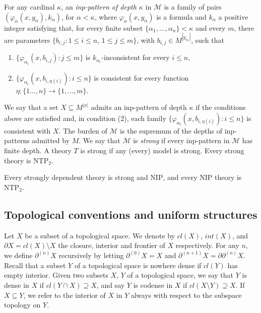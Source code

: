 \documentclass[12pt]{article}
\newcommand{\Mm}{\mathcal{M}}
\newcommand{\NIP}{\ensuremath{\mathrm{NIP}}}
\newcommand{\NTP}{\ensuremath{\mathrm{NTP}_2}}
\newcommand{\TP}{\ensuremath{\mathrm{TP}_2}}
\newcommand{\partn}[1]{\partial^{(#1)}}
\theoremstyle{definition}
\theoremstyle{remark}
\begin{document}
For any cardinal $\kappa$, an \emph{inp-pattern of depth $\kappa$} in $\Mm$ is a family of pairs $
(\varphi_\alpha(x,y_\alpha), k_\alpha)
$,
for $\alpha < \kappa$, where $\varphi_\alpha(x,y_\alpha)$ is a formula and $k_\alpha$ a positive integer satisfying that, for every finite subset $\{ \alpha_1,\ldots, \alpha_n\} < \kappa$ and every $m$, there are parameters \mbox{$\{b_{i,j} : 1\leq i\leq n, \, 1\leq j \leq m\}$}, with $b_{i,j}\in M^{|y_{\alpha_i}|}$, such that
\begin{enumerate}[(1)]
    \item $\{\varphi_{\alpha_i}(x , b_{i,j}) : j \leq m\}$ is $k_{\alpha_i}$-inconsistent for every $i\leq n$,
    \item $\{\varphi_{\alpha_i}(x, b_{i,\eta(i)}) : i\leq n\}$ is consistent for every function $\eta : \{1\ldots, n\} \rightarrow \{1,\ldots, m\}$.
\end{enumerate}
We say that a set $X\subseteq M^{|x|}$ admits an inp-pattern of depth $\kappa$ if the conditions above are satisfied and, in condition (2), each family $\{\varphi_{\alpha_i}(x, b_{i,\eta(i)}) : i\leq n\}$ is consistent with $X$. The burden of $\Mm$ is the supremum of the depths of inp-patterns admitted by $M$. %
We say that $\Mm$ is \emph{strong} if every inp-pattern in $\Mm$ has finite depth. A theory $T$ is strong if any (every) model is strong. Every strong theory is $\NTP$.

Every strongly dependent theory is strong and $\NIP$, and every $\NIP$ theory is $\NTP$. %

\subsection{Topological conventions and uniform structures}

Let $X$ be a subset of a topological space. We denote by $cl(X)$, $int(X)$, and $\partial X = cl(X)\setminus X$ the closure, interior and frontier of $X$ respectively. For any $n$, we define $\partial^{(n)}X$ recursively by letting $\partial^{(0)}X=X$ and $\partial^{(n+1)}X= \partial \partn{n}X$. Recall that a subset $Y$ of a topological space is nowhere dense if $cl(Y)$ has empty interior. Given two subsets $X$, $Y$ of a topological space, we say that $Y$ is dense in $X$ if $cl(Y\cap X) \supseteq X$, and say $Y$ is codense in $X$ if $cl(X\setminus Y) \supseteq X$. If $X\subseteq Y$, we refer to the interior of $X$ in $Y$ always with respect to the subspace topology on $Y$. 
\end{document}
